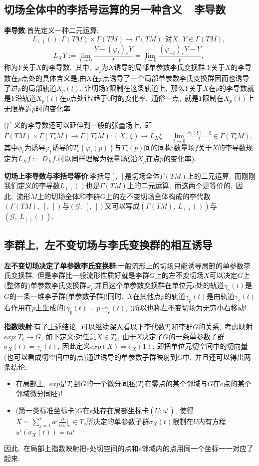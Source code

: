 \subsection{切场全体中的李括号运算的另一种含义\ \raisebox{0.5mm}{------}\ 李导数}

\textbf{李导数}:首先定义一种二元运算:
$$L_{()}():\Gamma(TM)\times \Gamma(TM)\rightarrow\Gamma(TM):\text{对}X,\ Y\in\Gamma(TM),\ $$
$$L_XY:=\lim\limits_{t\rightarrow 0}\frac{Y-(\varphi_t)_*Y}{t}=\lim\limits_{t\rightarrow0}\frac{(\varphi_{-t})_*Y-Y}{t},\ $$
称为$Y$关于$X$的李导数,\ 其中,\ $\varphi_t$为$X$诱导的局部单参数李氏变换群.$Y$关于$X$的李导数在$p$点处的具体含义是:由$X$在$p$点诱导了一个局部单参数李氏变换群因而也诱导了过$p$的局部轨道$X_p(t),\ $让切场$Y$限制在这条轨道上,\ 那么$Y$关于$X$在$p$的李导数就是$Y$沿轨道$X_p(t)$在$p$点处让$t$趋于0时的变化率,\ 通俗一点,\ 就是$Y$限制在$X_p(t)$上无限靠近$p$时的变化率.

(广义的李导数还可以延伸到一般的张量场上,\ 即$\Gamma(TM)\times\Gamma(T_s^rM)\rightarrow\Gamma(T_s^rM):(X,\ \xi)\rightarrow L_X\xi=\lim\limits_{t\rightarrow 0}\frac{\phi_t(\xi)-\xi}{t}\in\Gamma(T_s^rM),\ $其中$\phi_t$为诱导$\varphi_t$诱导的$T_s^r(\varphi_t(p))$与$T_s^r(p)$间的同构;数量场$f$关于$X$的李导数规定为$L_Xf:=D_Xf.$可以同样理解为张量场$\xi$沿$X_p$在点$p$的变化率).

\textbf{切场上李导数与李括号等价}:李括号$[,\ ]$是切场全体$\Gamma(TM)$上的二元运算,\ 而刚刚我们定义的李导数$L_{()}()$也是$\Gamma(TM)$上的二元运算,\ 而这两个是等价的,\ 因此,\ 流形$M$上的切场全体和李群$G$上的左不变切场全体构成的李代数$(\Gamma(TM),\ [,\ ])$与$(\mathcal{G},\ [,\ ])$又可以写成$(\Gamma(TM),\ L_{()}())$与$(\mathcal{G},\ L_{()}()).$

\subsection{李群上,\ 左不变切场与李氏变换群的相互诱导}

\textbf{左不变切场决定了单参数李氏变换群}:一般流形上的切场只能诱导局部的单参数李氏变换群,\ 但是李群比一般流形性质好就是李群$G$上的左不变切场$X$可以决定$G$上(整体的)单参数李氏变换群$\varphi_t$!并且这个单参数变换群在单位元$e$处的轨道$\gamma_e(t)$是$G$的一条一维李子群(单参数子群)!同时,\ $X$在其他点$p$的轨道$\gamma_p(t)$是由轨道$\gamma_e(t)$右作用在$p$上生成的($\gamma_p(t)=p\cdot \gamma_e(t),\ $)所以也称左不变切场为无穷小右移动!

\textbf{指数映射}:有了上述结论,\ 可以继续深入看以下李代数$T_e$和李群$G$的关系,\ 考虑映射$exp:T_e\rightarrow G,\ $如下定义:对任意$X\in T_e,\ $由于$X$决定了$G$的一条单参数子群$\sigma_X(t)=\gamma_e(t),\ $因此定义$exp(X)=\sigma_X(1),\ $即把单位元切空间中的切向量(也可以看成切空间中的点)通过诱导的单参数子群映射到$G$中,\ 并且还可以得出两条结论:
\begin{itemize}
	\item 在局部上,\ $exp$是$T_e$到$G$的一个微分同胚($T_e$在零点的某个邻域与$G$在$e$点的某个邻域微分同胚)!
	\item (第一类标准坐标卡)$G$在$e$处存在局部坐标卡$(U;u^i),\ $使得$X=\sum\limits_{j=1}^{r}a^j\frac{\partial}{\partial u^j}|_e\in T_e$所决定的单参数子群$\sigma_X(t)$限制在$U$内有方程$u^i(\sigma_X(t))=ta^i$
\end{itemize}
因此,\ 在局部上指数映射把$e$处切空间的点和$e$邻域内的点用同一个坐标一一对应了起来.